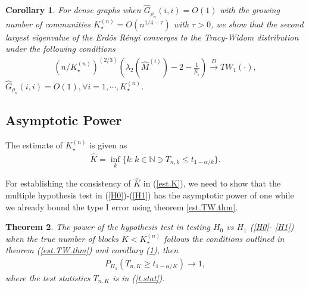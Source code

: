\documentclass[11pt]{article}
\newtheorem{theorem}{Theorem}[section]
\newtheorem{corollary}[theorem]{Corollary}
\newcommand{\be}{\begin{eqnarray}}
\newcommand{\ee}{\end{eqnarray}}
\begin{document}
\begin{corollary}\label{cor.est.TW}
For dense graphs when $\hat{G}_{\rho_n}(i,i) = O(1)$ with the growing number of communities $K_{\star}^{(n)} = O(n^{1/4 - \tau})$ with $\tau >0$, we show that
the second largest eigenvalue of the Erd\"{o}s R\'{e}nyi converges to the Tracy-Widom distribution under the following conditions
\be\label{est.tW}
(n/K_{\star}^{(n)})^{(2/3)}(\lambda_2(\hat{M}^{(i)}) - 2 - \frac{1}{\hat{\mu}_i}) \xrightarrow[]{D} TW_1(\cdot),
\ee
{} $\hat{G}_{\rho_n}(i,i) = O(1),  \forall i =1, \cdots, K_{\star}^{(n)}$.
\end{corollary}

\subsection{Asymptotic Power} The estimate of $K_{\star}^{(n)}$ is given as
\be\label{est.K}
\hat{K} = \inf_{k}\{k : k \in \mathbb{N} \ni T_{n, k} \le t_{1 - \alpha/k} \}.
\ee

For establishing the consistency of $\hat{K}$ in (\ref{est.K}), we need to show that the multiple hypothesis test in (\ref{H0})-(\ref{H1}) has the asymptotic power of one while we already bound the type I error using theorem \ref{est.TW.thm}.

\begin{theorem}\label{asm.power}
The power of the hypothesis test in testing $H_0$ vs $H_1$ (\ref{H0}- \ref{H1}) when the true number of blocks $K < K_{\star}^{(n)}$ follows the conditions outlined in theorem (\ref{est.TW.thm}) and corollary (\ref{cor.est.TW}), then
\be
P_{H_1}(T_{n, K} \ge t_{1 - \alpha/K}) \to 1,
\ee
where the test statistics $T_{n, K}$ is in (\ref{t.stat}).
\end{theorem}
\end{document}
